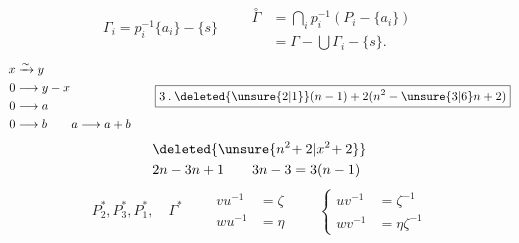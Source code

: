 \[
 \Gamma_i=p_i^{-1}\{a_i\}-\{s\}
 \qquad\begin{aligned}
 \overset{\circ}{\Gamma}&=\bigcap_i p_i^{-1}(P_i-\{a_i\})\\
 &=\Gamma-\bigcup \Gamma_i-\{s\}.
 \end{aligned}
\]
\[
 \begin{aligned}
 x&\xrightarrow{\sim}y\\0&\longrightarrow y-x\\0&\longrightarrow a\\
 0&\longrightarrow b\qquad a\longrightarrow a+b
 \end{aligned}
 \qquad
 \boxed{3\mathbin{.}\deleted{\unsure{2|1}}(n-1)+2(n^2-\unsure{3|6}n+2)}
\]
\[
 \begin{aligned}
 &\deleted{\unsure{n^2\!+2|x^2\!+2}}\\
 &2n-3n+1\qquad 3n-3=3(n-1)
 \end{aligned}
\]
\[
 P_2^{*},P_3^{*},P_1^{*},\quad \Gamma^{*}\qquad
 \begin{aligned}
 vu^{-1}&=\zeta\\wu^{-1}&=\eta
 \end{aligned}
 \qquad
 \left\{\begin{aligned}uv^{-1}&=\zeta^{-1}\\wv^{-1}&=\eta\zeta^{-1}\end{aligned}\right.
\]
